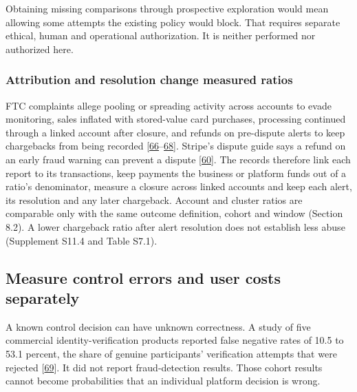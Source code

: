 \documentclass[acmlarge,review,anonymous,nonacm]{acmart}
\begin{document}
Obtaining missing comparisons through prospective exploration would mean
allowing some attempts the existing policy would block. That requires
separate ethical, human and operational authorization. It is neither
performed nor authorized here.

\hypertarget{attribution-and-resolution-change-measured-ratios}{%
\subsubsection*{Attribution and resolution change measured
ratios}\label{attribution-and-resolution-change-measured-ratios}}

FTC complaints allege pooling or spreading activity across accounts to
evade monitoring, sales inflated with stored-value card purchases,
processing continued through a linked account after closure, and refunds
on pre-dispute alerts to keep chargebacks from being recorded
{[}\protect\hyperlink{ref-FTC2020FirstData}{66}--\protect\hyperlink{ref-FTC2025Paddle}{68}{]}.
Stripe's dispute guide says a refund on an early fraud warning can
prevent a dispute {[}\protect\hyperlink{ref-Stripe2026Disputes}{60}{]}.
The records therefore link each report to its transactions, keep
payments the business or platform funds out of a ratio's denominator,
measure a closure across linked accounts and keep each alert, its
resolution and any later chargeback. Account and cluster ratios are
comparable only with the same outcome definition, cohort and window
(Section 8.2). A lower chargeback ratio after alert resolution does not
establish less abuse (Supplement S11.4 and Table S7.1).

\hypertarget{measure-control-errors-and-user-costs-separately}{%
\subsection{Measure control errors and user costs
separately}\label{measure-control-errors-and-user-costs-separately}}

A known control decision can have unknown correctness. A study of five
commercial identity-verification products reported false negative rates
of 10.5 to 53.1 percent, the share of genuine participants' verification
attempts that were rejected
{[}\protect\hyperlink{ref-Fatima2024}{69}{]}. It did not report
fraud-detection results. Those cohort results cannot become
probabilities that an individual platform decision is wrong.
\end{document}
